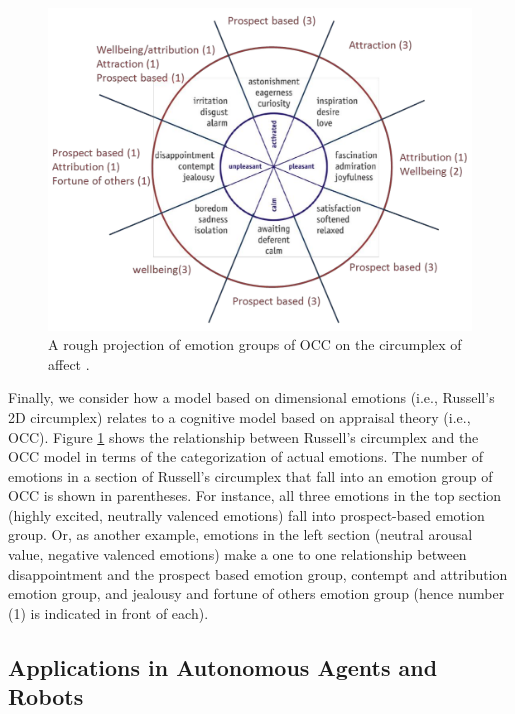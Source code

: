 \documentclass[12pt]{report}
\begin{document}
\begin{figure}[tbh]
  \center
  \includegraphics[width=.9\textwidth]{figure/occ-circumplex-mapping.png}
  \caption{A rough projection of emotion groups of OCC on the circumplex of
  affect \cite{ahmadpour:occ-dimensional-comparison}.}
  \label{fig:occ-circumplex}
\end{figure}

Finally, we consider how a model based on dimensional emotions (i.e., Russell's
2D circumplex) relates to a cognitive model based on appraisal theory (i.e.,
OCC). Figure \ref{fig:occ-circumplex} shows the relationship between Russell's
circumplex and the OCC model in terms of the categorization of actual emotions.
The number of emotions in a section of Russell's circumplex that fall into an
emotion group of OCC is shown in parentheses. For instance, all three emotions
in the top section (highly excited, neutrally valenced emotions) fall into
prospect-based emotion group. Or, as another example, emotions in the left
section (neutral arousal value, negative valenced emotions) make a one to one
relationship between disappointment and the prospect based emotion group,
contempt and attribution emotion group, and jealousy and fortune of others
emotion group (hence number (1) is indicated in front of each).

\subsection{Applications in Autonomous Agents and Robots}
\label{sec:applications}
\end{document}
